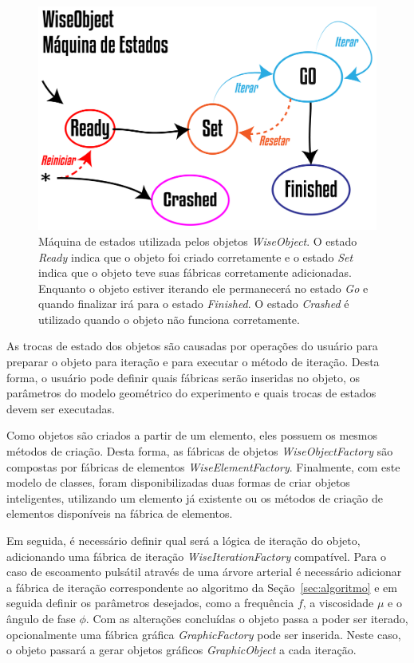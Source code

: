 \begin{figure}[!htbp]
	\centering
	\includegraphics[scale=2]{Figures/WiseObjectStatus@16x.png}
	\caption{Máquina de estados utilizada pelos objetos \textit{WiseObject}. O estado \textit{Ready} indica que o objeto foi criado corretamente e o estado \textit{Set} indica que o objeto teve suas fábricas corretamente adicionadas. Enquanto o objeto estiver iterando ele permanecerá no estado \textit{Go} e quando finalizar irá para o estado \textit{Finished}. O estado \textit{Crashed} é utilizado quando o objeto não funciona corretamente.}
	\label{fig7:wiseobjectstatuses}
\end{figure}

As trocas de estado dos objetos são causadas por operações do usuário para preparar o objeto para iteração e para executar o método de iteração. Desta forma, o usuário pode definir quais fábricas serão inseridas no objeto, os parâmetros do modelo geométrico do experimento e quais trocas de estados devem ser executadas.

Como objetos são criados a partir de um elemento, eles possuem os mesmos métodos de criação. Desta forma, as fábricas de objetos \textit{WiseObjectFactory} são compostas por fábricas de elementos \textit{WiseElementFactory}. Finalmente, com este modelo de classes, foram disponibilizadas duas formas de criar objetos inteligentes, utilizando um elemento já existente ou os métodos de criação de elementos disponíveis na fábrica de elementos.

Em seguida, é necessário definir qual será a lógica de iteração do objeto, adicionando uma fábrica de iteração \textit{WiseIterationFactory} compatível. Para o caso de escoamento pulsátil através de uma árvore arterial é necessário adicionar a fábrica de iteração correspondente ao algoritmo da Seção~\ref{sec:algoritmo} e em seguida definir os parâmetros desejados, como a frequência $f$, a viscosidade $\mu$ e o ângulo de fase $\phi$. Com as alterações concluídas o objeto passa a poder ser iterado, opcionalmente uma fábrica gráfica \textit{GraphicFactory} pode ser inserida. Neste caso, o objeto passará a gerar objetos gráficos \textit{GraphicObject} a cada iteração.

